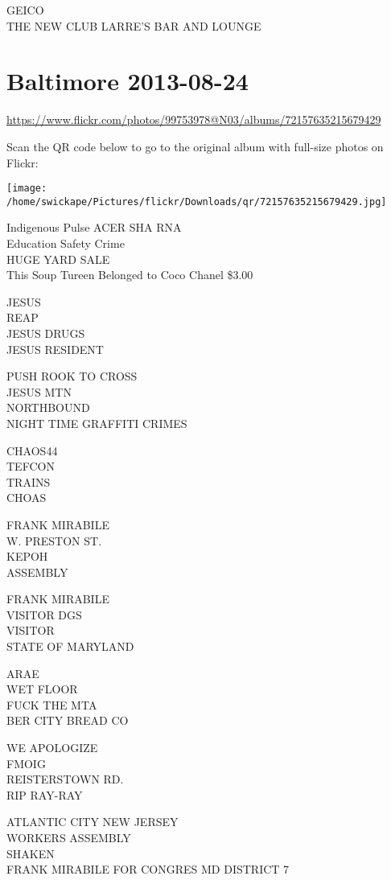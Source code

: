 \documentclass[10pt,letterpaper]{article}
\begin{document}
GEICO\\
THE NEW CLUB LARRE'S BAR AND LOUNGE


\section*{Baltimore 2013-08-24}

\url{https://www.flickr.com/photos/99753978@N03/albums/72157635215679429}

Scan the QR code below to go to the original album with full-size photos on Flickr:

\texttt{[image: /home/swickape/Pictures/flickr/Downloads/qr/72157635215679429.jpg]}


Indigenous Pulse ACER SHA RNA\\
Education Safety Crime\\
HUGE YARD SALE\\
This Soup Tureen Belonged to Coco Chanel \$3.00

JESUS\\
REAP\\
JESUS DRUGS\\
JESUS RESIDENT

PUSH ROOK TO CROSS\\
JESUS MTN\\
NORTHBOUND\\
NIGHT TIME GRAFFITI CRIMES

CHAOS44\\
TEFCON\\
TRAINS\\
CHOAS

FRANK MIRABILE\\
W. PRESTON ST.\\
KEPOH\\
ASSEMBLY

FRANK MIRABILE\\
VISITOR DGS\\
VISITOR\\
STATE OF MARYLAND

ARAE\\
WET FLOOR\\
FUCK THE MTA\\
BER CITY BREAD CO

WE APOLOGIZE\\
FMOIG\\
REISTERSTOWN RD.\\
RIP RAY{-}RAY

ATLANTIC CITY NEW JERSEY\\
WORKERS ASSEMBLY\\
SHAKEN\\
FRANK MIRABILE FOR CONGRES MD DISTRICT 7
\end{document}
